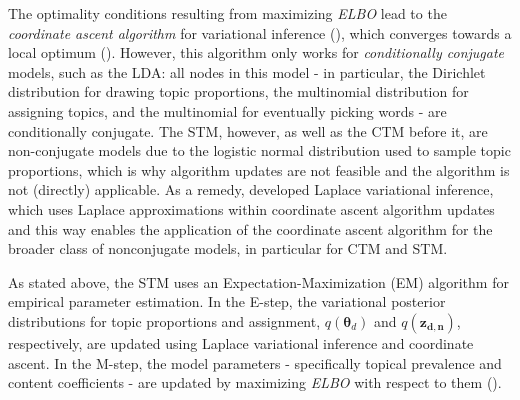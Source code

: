 The optimality conditions resulting from maximizing \textit{ELBO} lead to the \textit{coordinate ascent algorithm} for variational inference (\citealp{wang2013variational}), which converges towards a local optimum (\citealp{bishop2006pattern}). However, this algorithm only works for \textit{conditionally conjugate} models, such as the LDA: all nodes in this model - in particular, the Dirichlet distribution for drawing topic proportions, the multinomial distribution for assigning topics, and the multinomial for eventually picking words - are conditionally conjugate. The STM, however, as well as the CTM before it, are non-conjugate models due to the logistic normal distribution used to sample topic proportions, which is why algorithm updates are not feasible and the algorithm is not (directly) applicable. As a remedy, \cite{wang2013variational} developed Laplace variational inference, which uses Laplace approximations within coordinate ascent algorithm updates and this way enables the application of the coordinate ascent algorithm for the broader class of nonconjugate models, in particular for CTM and STM.

As stated above, the STM uses an Expectation-Maximization (EM) algorithm for empirical parameter estimation. In the E-step, the variational posterior distributions for topic proportions and assignment, $q(\boldsymbol{\theta}_d)$ and $q(\boldsymbol{z_{d,n}})$, respectively, are updated using Laplace variational inference and coordinate ascent. In the M-step, the model parameters - specifically topical prevalence and content coefficients - are updated by maximizing \textit{ELBO} with respect to them (\citealp{roberts2016model}).